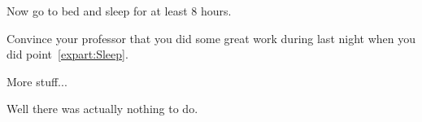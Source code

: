 \documentclass[11pt,a4paper]{article}
\begin{document}
\MakeUebungHeader


\begin{exenumerate} %
\item \label{expart:Sleep} Now go to bed and sleep for at least 8 hours.
\item Convince your professor that you did some great work during last night when you did
  point~\ref{expart:Sleep}.
\end{exenumerate}


\uebung{} %





More stuff...

\begin{solution} %
  Well there was actually nothing to do.
\end{solution}
\end{document}
